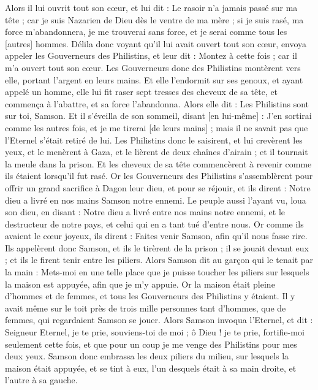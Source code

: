\begin{multicols}{2}
Alors il lui ouvrit tout son cœur, et lui dit : Le rasoir n'a jamais passé sur ma tête ; car je suis Nazarien de Dieu dès le ventre de ma mère ; si je suis rasé, ma force m'abandonnera, je me trouverai sans force, et je serai comme tous les [autres] hommes.
Délila donc voyant qu'il lui avait ouvert tout son cœur, envoya appeler les Gouverneurs des Philistins, et leur dit : Montez à cette fois ; car il m'a ouvert tout son cœur. Les Gouverneurs donc des Philistins montèrent vers elle, portant l'argent en leurs mains.
Et elle l'endormit sur ses genoux, et ayant appelé un homme, elle lui fit raser sept tresses des cheveux de sa tête, et commença à l'abattre, et sa force l'abandonna.
Alors elle dit : Les Philistins sont sur toi, Samson. Et il s'éveilla de son sommeil, disant [en lui-même] : J'en sortirai comme les autres fois, et je me tirerai [de leurs mains] ; mais il ne savait pas que l'Eternel s'était retiré de lui.
Les Philistins donc le saisirent, et lui crevèrent les yeux, et le menèrent à Gaza, et le lièrent de deux chaînes d'airain ; et il tournait la meule dans la prison.
Et les cheveux de sa tête commencèrent à revenir comme ils étaient lorsqu'il fut rasé.
Or les Gouverneurs des Philistins s'assemblèrent pour offrir un grand sacrifice à Dagon leur dieu, et pour se réjouir, et ils dirent : Notre dieu a livré en nos mains Samson notre ennemi.
Le peuple aussi l'ayant vu, loua son dieu, en disant : Notre dieu a livré entre nos mains notre ennemi, et le destructeur de notre pays, et celui qui en a tant tué d'entre nous.
Or comme ils avaient le cœur joyeux, ils dirent : Faites venir Samson, afin qu'il nous fasse rire. Ils appelèrent donc Samson, et ils le tirèrent de la prison ; il se jouait devant eux ; et ils le firent tenir entre les piliers.
Alors Samson dit au garçon qui le tenait par la main : Mets-moi en une telle place que je puisse toucher les piliers sur lesquels la maison est appuyée, afin que je m'y appuie.
Or la maison était pleine d'hommes et de femmes, et tous les Gouverneurs des Philistins y étaient. Il y avait même sur le toit près de trois mille personnes tant d'hommes, que de femmes, qui regardaient Samson se jouer.
Alors Samson invoqua l'Eternel, et dit : Seigneur Eternel, je te prie, souviens-toi de moi ; ô Dieu ! je te prie, fortifie-moi seulement cette fois, et que pour un coup je me venge des Philistins pour mes deux yeux.
Samson donc embrassa les deux piliers du milieu, sur lesquels la maison était appuyée, et se tint à eux, l'un desquels était à sa main droite, et l'autre à sa gauche.

\end{multicols}
